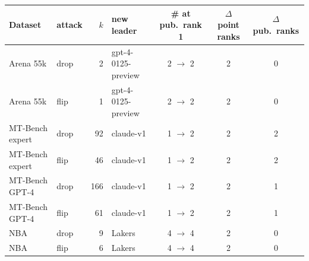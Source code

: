 {\scriptsize\setlength{\tabcolsep}{3pt}\begin{tabular}{@{}llrlccc@{}}\toprule
Dataset & attack & $k$ & new leader & \# at pub.\ rank 1 & $\Delta$ point ranks & $\Delta$ pub.\ ranks\\\midrule
Arena 55k & drop & 2 & gpt-4-0125-preview & 2 $\to$ 2 & 2 & 0 \\
Arena 55k & flip & 1 & gpt-4-0125-preview & 2 $\to$ 2 & 2 & 0 \\
MT-Bench expert & drop & 92 & claude-v1 & 1 $\to$ 2 & 2 & 2 \\
MT-Bench expert & flip & 46 & claude-v1 & 1 $\to$ 2 & 2 & 2 \\
MT-Bench GPT-4 & drop & 166 & claude-v1 & 1 $\to$ 2 & 2 & 1 \\
MT-Bench GPT-4 & flip & 61 & claude-v1 & 1 $\to$ 2 & 2 & 1 \\
NBA & drop & 9 & Lakers & 4 $\to$ 4 & 2 & 0 \\
NBA & flip & 6 & Lakers & 4 $\to$ 4 & 2 & 0 \\
\bottomrule\end{tabular}}
